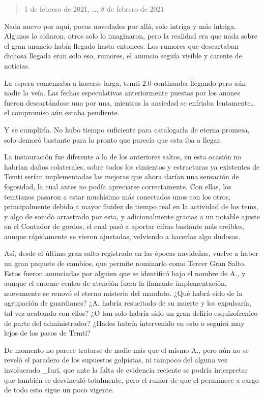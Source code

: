 \documentclass[
  spanish,
]{book}
\begin{document}
\begin{quote}
1 de febrero de 2021, \ldots, 8 de febrero de 2021
\end{quote}

Nada nuevo por aquí, pocas novedades por allá, solo intriga y más intriga. Algunos lo soñaron, otros solo lo imaginaron, pero la realidad era que nada sobre el gran anuncio había llegado hasta entonces. Los rumores que descartaban dichosa llegada eran solo eso, rumores, el anuncio seguía visible y carente de noticias.

La espera comenzaba a hacerse larga, temti 2.0 continuaba llegando pero aún nadie la veía. Las fechas especulativas anteriormente puestas por los anones fueron descartándose una por una, mientras la ansiedad se enfriaba lentamente\ldots{} el compromiso aún estaba pendiente.

Y se cumpliría. No hubo tiempo suficiente para catalogarla de eterna promesa, solo demoró bastante para lo pronto que parecía que esta iba a llegar.

La instauración fue diferente a la de los anteriores saltos, en esta ocasión no habrían daños colaterales, sobre todos los cimientos y estructuras ya existentes de Temti serían implementadas las mejoras que ahora darían una sensación de fogosidad, la cual antes no podía apreciarse correctamente. Con ellas, los temtianos pasaron a estar muchísimo más conectados unos con los otros, principalmente debido a mayor fluidez de tiempo real en la actividad de los tems, y algo de sonido arrastrado por esta, y adicionalmente gracias a un notable ajuste en el Contador de gordos, el cual pasó a aportar cifras bastante más creíbles, aunque rápidamente se vieron ajustadas, volviendo a hacerlas algo dudosas.

Así, desde el último gran salto registrado en las épocas navideñas, vuelve a haber un gran paquete de cambios, que permite nominarlo como Tercer Gran Salto. Estos fueron anunciadas por alguien que se identificó bajo el nombre de A., y aunque el enorme centro de atención fuera la flamante implementación, nuevamente se renovó el eterno misterio del mandato. ¿Qué habrá sido de la agrupación de guardianes? ¿A. habría resucitado de su muerte y los expulsaría, tal vez acabando con ellos? ¿O tan solo habría sido un gran delirio esquizofrenico de parte del administrador? ¿Hades habría intervenido en esto o seguirá muy lejos de los pasos de Temti?

De momento no parece tratarse de nadie más que el mismo A., pero aún no se reveló el paradero de los supuestos golpistas, ni tampoco del alguna vez involucrado \_Iuri, que ante la falta de evidencia reciente se podría interpretar que también se desvinculó totalmente, pero el rumor de que el permanece a cargo de todo esto sigue un poco vigente.
\end{document}

